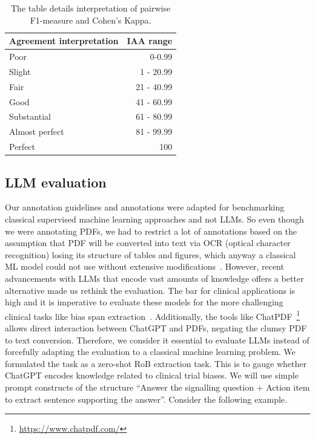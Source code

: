 \documentclass[sn-mathphys,Numbered]{sn-jnl}%
\theoremstyle{thmstyleone}%
\theoremstyle{thmstyletwo}%
\theoremstyle{thmstylethree}%
\begin{document}
%
%
%
\begin{center}
 \begin{table}[htb]
   \caption{The table details interpretation of pairwise F1-measure and Cohen's Kappa.}\label{tab:iaa_interpret}
 \centering
    \begin{tabular}{lr}
    \toprule
    Agreement interpretation & IAA range \\ 
    \midrule
        Poor & 0-0.99 \\ 
        Slight & 1 - 20.99 \\ 
        Fair & 21 - 40.99 \\ 
        Good & 41 - 60.99 \\ 
        Substantial & 61 - 80.99 \\ 
        Almost perfect & 81 - 99.99 \\ 
        Perfect & 100 \\ 
    \bottomrule
    \end{tabular}
 \end{table}   
\end{center}
%
%
%
%
%
%
\subsection{LLM evaluation}
\label{method:llm}
%
Our annotation guidelines and annotations were adapted for benchmarking classical supervised machine learning approaches and not LLMs.
So even though we were annotating PDFs, we had to restrict a lot of annotations based on the assumption that PDF will be converted into text via OCR (optical character recognition) losing its structure of tables and figures, which anyway a classical ML model could not use without extensive modifications~\cite{li2019figure,li2023uttsr}.
However, recent advancements with LLMs that encode vast amounts of knowledge offers a better alternative made us rethink the evaluation.
The bar for clinical applications is high and it is imperative to evaluate these models for the more challenging clinical tasks like bias span extraction~\cite{singhal2023large}.
Additionally, the tools like ChatPDF~\footnote{\url{https://www.chatpdf.com/}} allows direct interaction between ChatGPT and PDFs, negating the clumsy PDF to text conversion.
Therefore, we consider it essential to evaluate LLMs instead of forcefully adapting the evaluation to a classical machine learning problem.
We formulated the task as a zero-shot RoB extraction task.
This is to gauge whether ChatGPT encodes knowledge related to clinical trial biases.
We will use simple prompt constructs of the structure ``Answer the signalling question + Action item to extract sentence supporting the answer''. Consider the following example.
\end{document}
